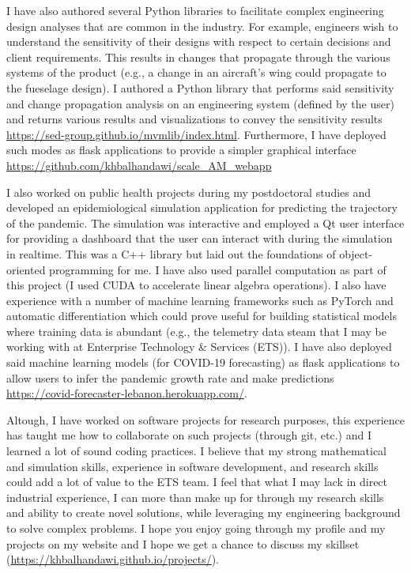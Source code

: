 \documentclass[12pt]{article} %
\begin{document}
I have also authored several Python libraries to facilitate complex engineering design analyses that are common in the industry. For example, engineers wish to understand the sensitivity of their designs with respect to certain decisions and client requirements. This results in changes that propagate through the various systems of the product (e.g., a change in an aircraft's wing could propagate to the fueselage design). I authored a Python library that performs said sensitivity and change propagation analysis on an engineering system (defined by the user) and returns various results and visualizations to convey the sensitivity results \href{https://sed-group.github.io/mvmlib/index.html}{https://sed-group.github.io/mvmlib/index.html}. Furthermore, I have deployed such modes as flask applications to provide a simpler graphical interface \href{https://github.com/khbalhandawi/scale_AM_webapp}{https://github.com/khbalhandawi/scale\_AM\_webapp}

\medskip %

I also worked on public health projects during my postdoctoral studies and developed an epidemiological simulation application for predicting the trajectory of the pandemic. The simulation was interactive and employed a Qt user interface for providing a dashboard that the user can interact with during the simulation in realtime. This was a C++ library but laid out the foundations of object-oriented programming for me. I have also used parallel computation as part of this project (I used CUDA to accelerate linear algebra operations). I also have experience with a number of machine learning frameworks such as PyTorch and automatic differentiation which could prove useful for building statistical models where training data is abundant (e.g., the telemetry data steam that I may be working with at Enterprise Technology \& Services (ETS)). I have also deployed said machine learning models (for COVID-19 forecasting) as flask applications to allow users to infer the pandemic growth rate and make predictions \href{https://covid-forecaster-lebanon.herokuapp.com/}{https://covid-forecaster-lebanon.herokuapp.com/}.

\medskip %

Altough, I have worked on software projects for research purposes, this experience has taught me how to collaborate on such projects (through git, etc.) and I learned a lot of sound coding practices. I believe that my strong mathematical and simulation skills, experience in software development, and research skills could add a lot of value to the ETS team. I feel that what I may lack in direct industrial experience, I can more than make up for through my research skills and ability to create novel solutions, while leveraging my engineering background to solve complex problems. I hope you enjoy going through my profile and my projects on my website and I hope we get a chance to discuss my skillset (\href{https://khbalhandawi.github.io/projects/}{https://khbalhandawi.github.io/projects/}).
\end{document}
